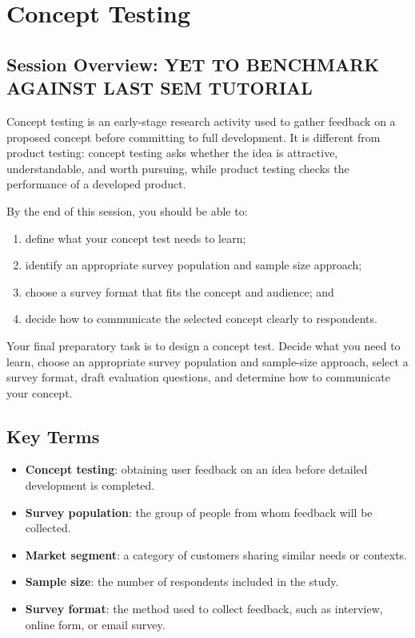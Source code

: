 \chapter{Concept Testing}

\section{Session Overview: YET TO BENCHMARK AGAINST LAST SEM TUTORIAL}

Concept testing is an early-stage research activity used to gather feedback on a proposed concept before committing to full development. It is different from product testing: concept testing asks whether the idea is attractive, understandable, and worth pursuing, while product testing checks the performance of a developed product.

By the end of this session, you should be able to:
\begin{enumerate}
    \item define what your concept test needs to learn;
    \item identify an appropriate survey population and sample size approach;
    \item choose a survey format that fits the concept and audience; and
    \item decide how to communicate the selected concept clearly to respondents.
\end{enumerate}

\begin{tcolorbox}[title=Goal]
Your final preparatory task is to design a concept test. Decide what you need to learn, choose an appropriate survey population and sample-size approach, select a survey format, draft evaluation questions, and determine how to communicate your concept.
\end{tcolorbox}

\section{Key Terms}

\begin{itemize}
    \item \textbf{Concept testing}: obtaining user feedback on an idea before detailed development is completed.
    \item \textbf{Survey population}: the group of people from whom feedback will be collected.
    \item \textbf{Market segment}: a category of customers sharing similar needs or contexts.
    \item \textbf{Sample size}: the number of respondents included in the study.
    \item \textbf{Survey format}: the method used to collect feedback, such as interview, online form, or email survey.
\end{itemize}

